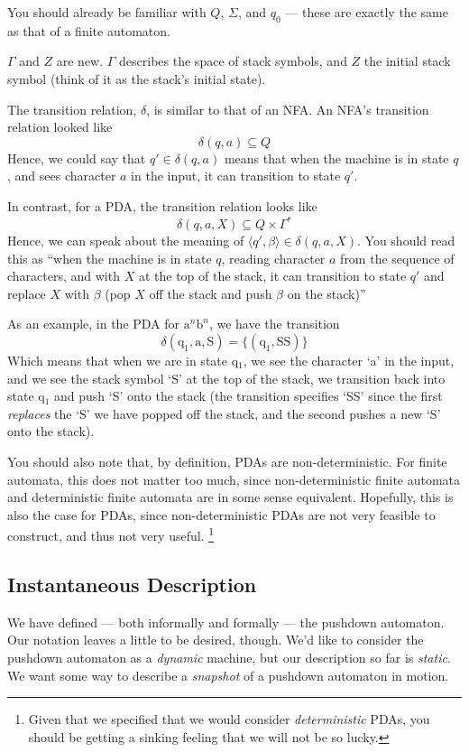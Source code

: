 You should already be familiar with $Q$, $\Sigma$, and $q_0$ --- these are exactly the same as that of a finite automaton.

$\Gamma$ and $Z$ are new. $\Gamma$ describes the space of stack symbols, and $Z$ the initial stack symbol (think of it as the stack's initial state).

The transition relation, $\delta$, is similar to that of an NFA. An NFA's transition relation looked like
\[\delta(q, a) \subseteq Q\]
Hence, we could say that $q' \in \delta(q, a)$ means that when the machine is in state $q$, and sees character $a$ in the input, it can transition to state $q'$.

In contrast, for a PDA, the transition relation looks like
\[\delta(q, a, X) \subseteq Q \times \Gamma^{*}\]
Hence, we can speak about the meaning of $\langle q', \beta \rangle \in \delta(q, a, X)$. You should read this as ``when the machine is in state $q$, reading character $a$ from the sequence of characters, and with $X$ at the top of the stack, it can transition to state $q'$ and replace $X$ with $\beta$ (pop $X$ off the stack and push $\beta$ on the stack)''

As an example, in the PDA for $\text{a}^n\text{b}^n$, we have the transition
\[\delta(\text{q}_1, \text{a}, \text{S}) = \{(\text{q}_1, \text{SS})\}\]
Which means that when we are in state q$_1$, we see the character `a' in the input, and we see the stack symbol `S' at the top of the stack, we transition back into state q$_1$ and push `S' onto the stack (the transition specifies `SS' since the first \textit{replaces} the `S' we have popped off the stack, and the second pushes a new `S' onto the stack).

You should also note that, by definition, PDAs are non-deterministic. For finite automata, this does not matter too much, since non-deterministic finite automata and deterministic finite automata are in some sense equivalent. Hopefully, this is also the case for PDAs, since non-deterministic PDAs are not very feasible to construct, and thus not very useful. \footnote{Given that we specified that we would consider \textit{deterministic} PDAs, you should be getting a sinking feeling that we will not be so lucky.}

\subsection{Instantaneous Description}
We have defined --- both informally and formally --- the pushdown automaton. Our notation leaves a little to be desired, though. We'd like to consider the pushdown automaton as a \textit{dynamic} machine, but our description so far is \textit{static}. We want some way to describe a \textit{snapshot} of a pushdown automaton in motion. 

